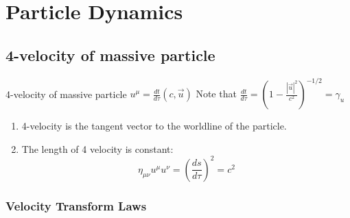 \documentclass[12pt,a4paper]{article}
\begin{document}
\begin{titlepage}
    \maketitle
\end{titlepage}

\tableofcontents

\newpage

\begin{abstract}
\noindent
Abstract of this course
\end{abstract}

\section{Particle Dynamics}
\subsection{4-velocity of massive particle}
\begin{definition}
    {4-velocity of massive particle}
    {$
    u^\mu=\frac{d t}{d \tau}(c, \vec{u})
    $}
    {Note that $
    \frac{d t}{d \tau}=\left(1-\frac{|\vec{u}|^2}{c^2}\right)^{-1 / 2}=\gamma_u
    $} 
\end{definition}
\begin{enumerate}
    \item 4-velocity is the tangent vector to the worldline of the particle.
    \item The length of 4 velocity is constant:
    $$
        \eta_{\mu \nu} u^\mu u^\nu=\left(\frac{d s}{d \tau}\right)^2=c^2
    $$
\end{enumerate}
\subsubsection{Velocity Transform Laws}
\end{document}
